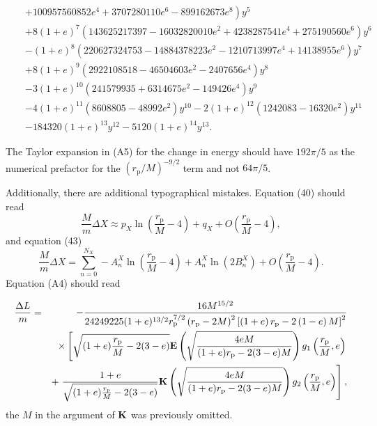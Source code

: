 \documentclass[aps,prd,amsfonts,amssymb,amsmath,nofootinbib,reprint,showpacs]{revtex4-1}
\newcommand{\sub}[1]{\ensuremath{_\text{#1}}}
\begin{document}
\begin{widetext}
\begin{eqnarray}
 & & + \left. 100957560852 e^4+3707280110 e^6-899162673 e^8\right) y^5 \nonumber \\ 
 & & + \left. 8 (1+e)^7 \left(143625217397-16032820010 e^2+4238287541 e^4+275190560 e^6\right) y^6 \right. \nonumber \\
 & & - \left. (1+e)^8 \left(220627324753-14884378223 e^2-1210713997 e^4+14138955 e^6\right) y^7 \right. \nonumber \\
 & & + \left. 8 (1+e)^9 \left(2922108518-46504603 e^2-2407656 e^4\right) y^8 \right. \nonumber \\
 & & - \left. 3 (1+e)^{10} \left(241579935+6314675 e^2-149426 e^4\right) y^9 \right. \nonumber \\
 & & - \left. 4 (1+e)^{11} \left(8608805-48992 e^2\right) y^{10}-2 (1+e)^{12} \left(1242083-16320 e^2\right) y^{11} \right. \nonumber \\
 & & - \left. 184320 (1+e)^{13} y^{12}-5120 (1+e)^{14} y^{13}\right..
\end{eqnarray}
\end{widetext}
The Taylor expansion in (A5) for the change in energy should have $192\pi/5$ as the numerical prefactor for the $(r\sub{p}/M)^{-9/2}$ term and not $64\pi/5$.

Additionally, there are additional typographical mistakes. Equation (40) should read
\begin{equation}
\frac{M}{m}\Delta X \approx p_X\ln\left(\frac{r\sub{p}}{M} - 4\right) + q_X + O\left(\frac{r\sub{p}}{M} - 4\right),
\end{equation}
and equation (43)
\begin{equation}
\frac{M}{m}\Delta X = \sum_{n=0}^{N_X}-A^X_n\ln\left(\frac{r\sub{p}}{M} - 4\right) + A^X_n\ln(2B^X_n)+ O\left(\frac{r\sub{p}}{M} - 4\right).
\end{equation}
Equation (A4) should read
\begin{widetext}
\begin{eqnarray}
\frac{\Delta L}{m} & = & - \frac{16 M^{15/2}}{24249225(1+e)^{13/2}r\sub{p}^{7/2}\left(r\sub{p}-2M\right)^2\left[\left(1+e\right)r\sub{p}-2\left(1-e\right)M\right]^2} \nonumber \\
 & & \times {} \left[ \sqrt{(1+e)\frac{r\sub{p}}{M}-2(3-e)} {\bf{E}}\left(\sqrt{\frac{4eM}{(1+e)r\sub{p}-2(3-e)M}}\right)g_1\left(\frac{r\sub{p}}{M},e\right) \right. \nonumber \\
 & & + \left. \frac{1+e}{\sqrt{(1+e)\frac{r\sub{p}}{M}-2(3-e)}} {\bf{K}}\left(\sqrt{\frac{4eM}{(1+e)r\sub{p}-2(3-e)M}}\right)g_2\left(\frac{r\sub{p}}{M},e\right)\right],
\end{eqnarray}
the $M$ in the argument of $\bf{K}$ was previously omitted.
\end{widetext}
\end{document}
